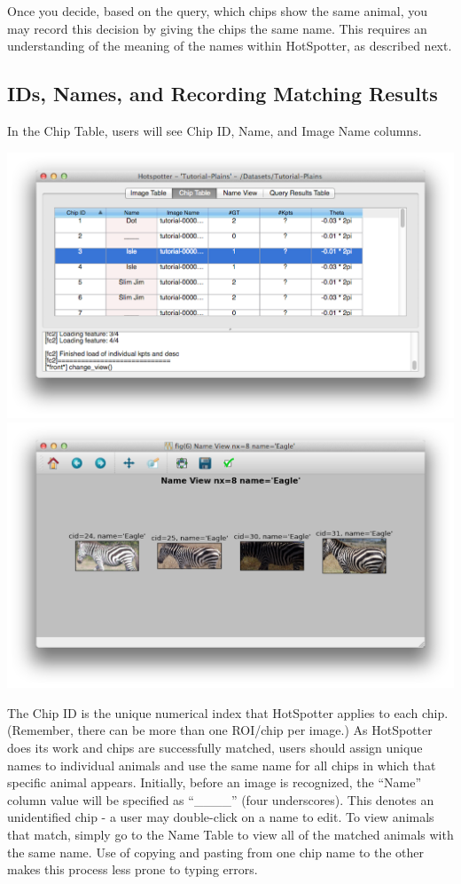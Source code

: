 \documentclass[a4paper,10pt]{article}
\begin{document}
\noindent
  Once you decide, based on the query, which chips show the
  same animal, you may record this decision by giving the chips the same
  name. This requires an understanding
  of the meaning of the names within HotSpotter, as described next.

\subsection{IDs, Names, and Recording Matching Results}

   In the Chip Table, users will see Chip ID, Name, and Image Name columns.

\begin{center}
            \includegraphics[scale=0.1]{images/names.png}
            \includegraphics[scale=0.1]{images/matches.png}
\end{center}

\noindent
  The Chip ID is the unique numerical index that HotSpotter applies to
  each chip.  (Remember, there can be more than one ROI/chip per image.)
  As HotSpotter does its work and chips are successfully matched,
  users should assign unique names to individual animals and use the same 
  name for all chips in which that specific animal appears.  Initially,
  before an image is recognized, the ``Name'' column value will
  be specified as ``\_\_\_\_'' (four underscores).  This denotes an
  unidentified chip - a user may double-click on a name to edit. 
  To view animals that match, simply go to the Name Table to view all of the matched animals with the same name. 
  Use of copying and pasting from one chip name to the other makes this process less prone to
  typing errors.
\end{document}
